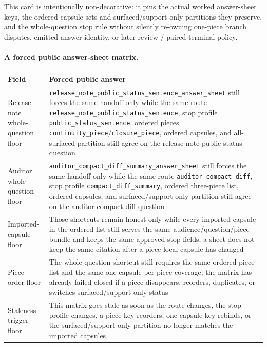 \documentclass[11pt]{article}
\begin{document}
This card is intentionally non-decorative: it pins the actual worked answer-sheet keys, the ordered capsule sets and surfaced/support-only partitions they preserve, and the whole-question stop rule without silently re-owning one-piece branch disputes, emitted-answer identity, or later review / paired-terminal policy.\cite{series:workedexample}

\paragraph{A forced public answer-sheet matrix.}
\begin{table}[t]
\centering
\small
\begin{tabularx}{\linewidth}{@{}LY@{}}
\toprule
Field & Forced public answer \\
\midrule
Release-note whole-question floor & \nolinkurl{release_note_public_status_sentence_answer_sheet} still forces the same handoff only while the same route \nolinkurl{release_note_public_status_sentence}, stop profile \nolinkurl{public_status_sentence}, ordered pieces \nolinkurl{continuity_piece}/\nolinkurl{closure_piece}, ordered capsules, and all-surfaced partition still agree on the release-note public-status question \\
Auditor whole-question floor & \nolinkurl{auditor_compact_diff_summary_answer_sheet} still forces the same handoff only while the same route \nolinkurl{auditor_compact_diff}, stop profile \nolinkurl{compact_diff_summary}, ordered three-piece list, ordered capsules, and surfaced/support-only partition still agree on the auditor compact-diff question \\
Imported-capsule floor & Those shortcuts remain honest only while every imported capsule in the ordered list still serves the same audience/question/piece bundle and keeps the same approved stop fields; a sheet does not keep the same citation after a piece-local capsule has changed \\
Piece-order floor & The whole-question shortcut still requires the same ordered piece list and the same one-capsule-per-piece coverage; the matrix has already failed closed if a piece disappears, reorders, duplicates, or switches surfaced/support-only status \\
Staleness trigger floor & This matrix goes stale as soon as the route changes, the stop profile changes, a piece key reorders, one capsule key rebinds, or the surfaced/support-only partition no longer matches the imported capsules \\

\end{tabularx}
\end{table}
\end{document}
